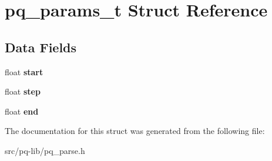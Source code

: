 \hypertarget{structpq__params__t}{}\section{pq\+\_\+params\+\_\+t Struct Reference}
\label{structpq__params__t}
\subsection*{Data Fields}
\begin{DoxyCompactItemize}
\item 
\hypertarget{structpq__params__t_af0e093306837d2a9c56b02eee0dfe707}{}float {\bfseries start}\label{structpq__params__t_af0e093306837d2a9c56b02eee0dfe707}

\item 
\hypertarget{structpq__params__t_af210de84c92291b33fe67cc36a709b9b}{}float {\bfseries step}\label{structpq__params__t_af210de84c92291b33fe67cc36a709b9b}

\item 
\hypertarget{structpq__params__t_a262f8526f435ee60c270b913f88b421e}{}float {\bfseries end}\label{structpq__params__t_a262f8526f435ee60c270b913f88b421e}

\end{DoxyCompactItemize}


The documentation for this struct was generated from the following file\+:\begin{DoxyCompactItemize}
\item 
src/pq-\/lib/pq\+\_\+parse.\+h\end{DoxyCompactItemize}
